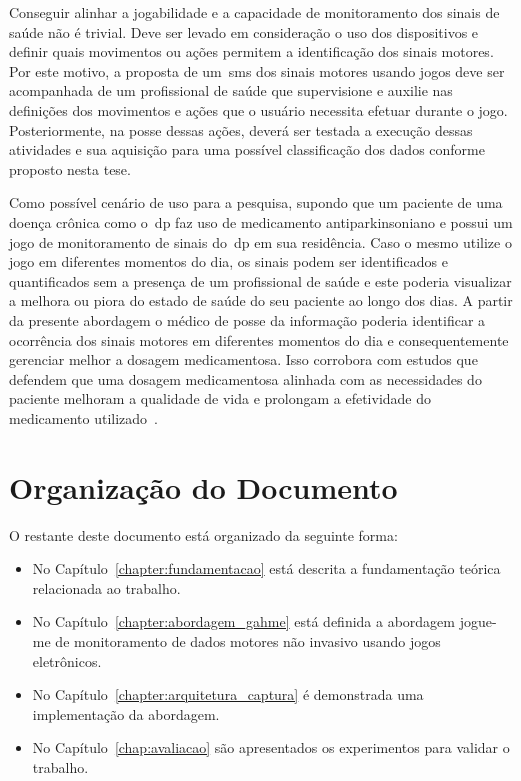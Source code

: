 Conseguir alinhar a jogabilidade e a capacidade de monitoramento dos sinais de saúde não é trivial. Deve ser levado em consideração o uso dos dispositivos e definir quais movimentos ou ações permitem a identificação dos sinais motores. Por este motivo, a proposta de um~\ac{sms} dos sinais motores usando jogos deve ser acompanhada de um profissional de saúde que supervisione e auxilie nas definições dos movimentos e ações que o usuário necessita efetuar durante o jogo. Posteriormente, na posse dessas ações, deverá ser testada a execução dessas atividades e sua aquisição para uma possível classificação dos dados conforme proposto nesta tese.

Como possível cenário de uso para a pesquisa, supondo que um paciente de uma doença crônica como o~\ac{dp} faz uso de medicamento antiparkinsoniano e possui um jogo de monitoramento de sinais do~\ac{dp} em sua residência. Caso o mesmo utilize o jogo em diferentes momentos do dia, os sinais podem ser identificados e quantificados sem a presença de um profissional de saúde e este poderia visualizar a melhora ou piora do estado de saúde do seu paciente ao longo dos dias. A partir da presente abordagem o médico de posse da informação poderia identificar a ocorrência dos sinais motores em diferentes momentos do dia e consequentemente gerenciar melhor a dosagem medicamentosa. Isso corrobora com estudos que defendem que uma dosagem medicamentosa alinhada com as necessidades do paciente melhoram a qualidade de vida e prolongam a efetividade do medicamento utilizado~\cite{rodrigues2006}.

\section{Organização do Documento}
O restante deste documento está organizado da seguinte forma:
\begin{itemize}
	\item No Capítulo~\ref{chapter:fundamentacao} está descrita a fundamentação teórica relacionada ao trabalho.
	\item No Capítulo~\ref{chapter:abordagem_gahme} está definida a abordagem \ac{jogue-me} de monitoramento de dados motores não invasivo usando jogos eletrônicos.
	\item No Capítulo~\ref{chapter:arquitetura_captura} é demonstrada uma implementação da abordagem.
	\item No Capítulo~\ref{chap:avaliacao} são apresentados os experimentos para validar o trabalho.
\end{itemize}
